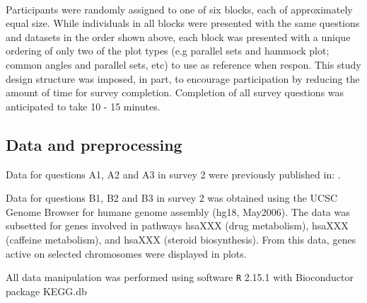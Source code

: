 \noindent \\Participants were randomly assigned to one of six blocks, each of approximately equal size. While individuals in all blocks were presented with the same questions and datasets in the order shown above, each block was presented with a unique ordering of only two of the plot types (e.g parallel sets and hammock plot; common angles and parallel sets, etc) to use as reference when respon. This study design structure was imposed, in part,  to encourage participation by reducing the amount of time for survey completion. Completion of all survey questions was anticipated to take 10 - 15 minutes.

\subsection*{Data and preprocessing}
Data for questions A1, A2 and A3 in survey 2 were previously published in: \citep{dawson:1995}.

Data for questions B1, B2 and B3 in survey 2 was obtained using the UCSC Genome Browser \cite{ucsc:2002} for humane genome assembly (hg18, May2006). The data was subsetted for genes involved in pathways hsaXXX (drug metabolism), hsaXXX (caffeine metabolism), and hsaXXX (steroid biosynthesis). From this data, genes active on selected chromosomes were displayed in plots.

All data manipulation was performed  using software {\tt R} 2.15.1 \citep{R} with Bioconductor package KEGG.db \cite{kegg}
%
%



